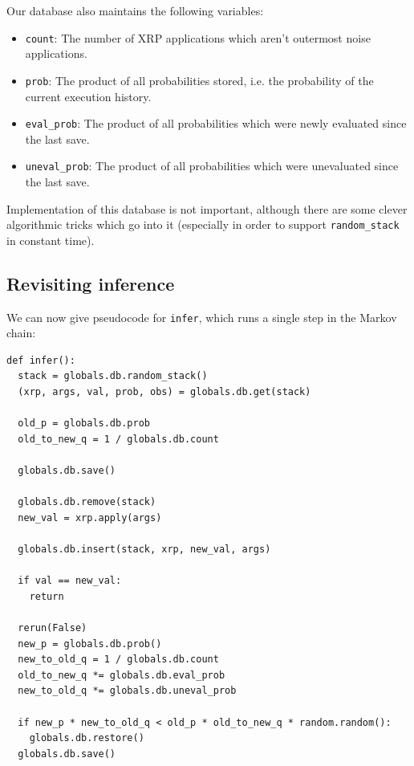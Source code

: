 \documentclass[11pt]{article}
\begin{document}
Our database also maintains the following variables:
\begin{itemize}
\item {\tt count}:  The number of XRP applications which aren't outermost noise applications.
\item {\tt prob}:  The product of all probabilities stored, i.e. the probability of the current execution history.
\item {\tt eval\_prob}:  The product of all probabilities which were newly evaluated since the last save.
\item {\tt uneval\_prob}:  The product of all probabilities which were unevaluated since the last save.
\end{itemize}

Implementation of this database is not important, although there are some clever algorithmic tricks which go into it (especially in order to support {\tt random\_stack} in constant time).  %

\subsection{Revisiting inference}

We can now give pseudocode for {\tt infer}, which runs a single step in the Markov chain:

\begin{small}
\begin{verbatim}
def infer():
  stack = globals.db.random_stack()
  (xrp, args, val, prob, obs) = globals.db.get(stack)

  old_p = globals.db.prob
  old_to_new_q = 1 / globals.db.count

  globals.db.save()

  globals.db.remove(stack)
  new_val = xrp.apply(args)

  globals.db.insert(stack, xrp, new_val, args)
  
  if val == new_val:
    return

  rerun(False)
  new_p = globals.db.prob() 
  new_to_old_q = 1 / globals.db.count
  old_to_new_q *= globals.db.eval_prob
  new_to_old_q *= globals.db.uneval_prob
  
  if new_p * new_to_old_q < old_p * old_to_new_q * random.random():
    globals.db.restore()
  globals.db.save()
\end{verbatim}
\end{small}
\end{document}
